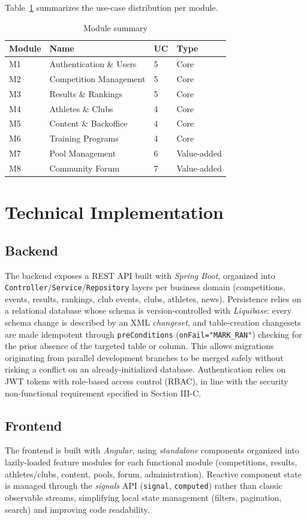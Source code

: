 \documentclass[conference]{IEEEtran}
\begin{document}
Table~\ref{tab:modules} summarizes the use-case distribution per module.

\begin{table}[h]
\caption{Module summary}
\label{tab:modules}
\centering
\begin{tabular}{p{0.9cm}p{3.3cm}p{1cm}p{1.6cm}}
\toprule
\textbf{Module} & \textbf{Name} & \textbf{UC} & \textbf{Type} \\
\midrule
M1 & Authentication \& Users & 5 & Core \\
M2 & Competition Management & 5 & Core \\
M3 & Results \& Rankings & 5 & Core \\
M4 & Athletes \& Clubs & 4 & Core \\
M5 & Content \& Backoffice & 4 & Core \\
M6 & Training Programs & 4 & Core \\
M7 & Pool Management & 6 & Value-added \\
M8 & Community Forum & 7 & Value-added \\
\bottomrule
\end{tabular}
\end{table}

\section{Technical Implementation}
\subsection{Backend}
The backend exposes a REST API built with \emph{Spring Boot}, organized into \texttt{Controller}/\texttt{Service}/\texttt{Repository} layers per business domain (competitions, events, results, rankings, club events, clubs, athletes, news). Persistence relies on a relational database whose schema is version-controlled with \emph{Liquibase}: every schema change is described by an XML \emph{changeset}, and table-creation changesets are made idempotent through \texttt{preConditions} (\texttt{onFail="MARK\_RAN"}) checking for the prior absence of the targeted table or column. This allows migrations originating from parallel development branches to be merged safely without risking a conflict on an already-initialized database. Authentication relies on JWT tokens with role-based access control (RBAC), in line with the security non-functional requirement specified in Section III-C.

\subsection{Frontend}
The frontend is built with \emph{Angular}, using \emph{standalone} components organized into lazily-loaded feature modules for each functional module (competitions, results, athletes/clubs, content, pools, forum, administration). Reactive component state is managed through the \emph{signals} API (\texttt{signal}, \texttt{computed}) rather than classic observable streams, simplifying local state management (filters, pagination, search) and improving code readability.
\end{document}
